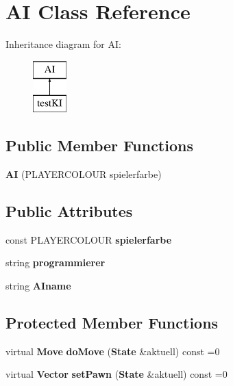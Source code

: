 \section{A\-I Class Reference}
\label{class_a_i}
Inheritance diagram for A\-I\-:\begin{figure}[H]
\begin{center}
\leavevmode
\includegraphics[height=2.000000cm]{class_a_i}
\end{center}
\end{figure}
\subsection*{Public Member Functions}
\begin{DoxyCompactItemize}
\item 
{\bfseries A\-I} (P\-L\-A\-Y\-E\-R\-C\-O\-L\-O\-U\-R spielerfarbe)\label{class_a_i_a9d4b371e83c5193e96d463cfb8cb6bae}

\end{DoxyCompactItemize}
\subsection*{Public Attributes}
\begin{DoxyCompactItemize}
\item 
const P\-L\-A\-Y\-E\-R\-C\-O\-L\-O\-U\-R {\bfseries spielerfarbe}\label{class_a_i_a87adeaec4c792d34d6df80b8b76c664d}

\item 
string {\bfseries programmierer}\label{class_a_i_a06b9b9ae45a8198a312a68b2d837dc5b}

\item 
string {\bfseries A\-Iname}\label{class_a_i_a6267e1052237d0fc5c9955cfb6b90dc6}

\end{DoxyCompactItemize}
\subsection*{Protected Member Functions}
\begin{DoxyCompactItemize}
\item 
virtual {\bf Move} {\bfseries do\-Move} ({\bf State} \&aktuell) const =0\label{class_a_i_a48035e33dd58899119f0e751602a9610}

\item 
virtual {\bf Vector} {\bfseries set\-Pawn} ({\bf State} \&aktuell) const =0\label{class_a_i_ad96c33348a3dfd758443a3f08fc711cf}

\end{DoxyCompactItemize}
